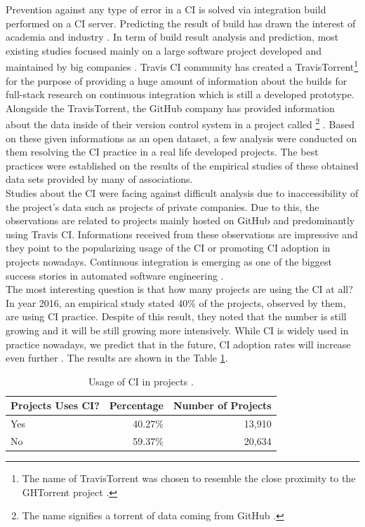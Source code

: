 Prevention against any type of error in a CI is solved via integration build performed on a CI server. Predicting the result of build has drawn the interest of academia and industry \cite{ResultsOfCIbuild}. In term of build result analysis and prediction, most existing studies focused mainly on a large software project developed and maintained by big companies \cite{ResultsOfCIbuild}. Travis CI community has created a TravisTorrent\footnote{The name of TravisTorrent was chosen to resemble the close proximity to the GHTorrent project \cite{TravisTorrentWEBPAGE}.} \cite{TravisTorrent} for the purpose of providing a huge amount of information about the builds for full-stack research on continuous integration which is still a developed prototype. Alongside the TravisTorrent, the GitHub company has provided information about the data inside of their version control system in a project called \footnote{The name signifies a torrent of data coming from GitHub \cite{GHTorrentWEBPAGE}.} \cite{GHTorrent}. Based on these given informations as an open dataset, a few analysis were conducted on them resolving the CI practice in a real life developed projects. The best practices were established on the results of the empirical studies of these obtained data sets provided by many of associations.\\

Studies about the CI were facing against difficult analysis due to inaccessibility of the project's data such as projects of private companies. Due to this, the observations are related to projects mainly hosted on GitHub and predominantly using Travis CI. Informations received from these observations are impressive and they point to the popularizing usage of the CI or promoting CI adoption in projects nowadays. Continuous integration is emerging as one of the biggest success stories in automated software engineering \cite{COPE}.\\

The most interesting question is that how many projects are using the CI at all? In year 2016, an empirical study stated 40\% \cite{COPE} of the projects, observed by them, are using CI practice. Despite of this result, they noted that the number is still growing and it will be still growing more intensively. While CI is widely used in practice nowadays, we predict that in the future, CI adoption rates will increase even further \cite{COPE}. The results are shown in the Table \ref{table:CI_usage}.

\begin{table}[H]
    \centering
    \caption{Usage of CI in projects \cite{COPE}.}
    \label{table:CI_usage}
    \begin{tabular}{lrr}
        \hline
        Projects Uses CI? & Percentage & Number of Projects \\
        \hline
        Yes               & 40.27\%    & 13,910             \\
        No                & 59.37\%    & 20,634             \\
        \hline
    \end{tabular}
\end{table}

